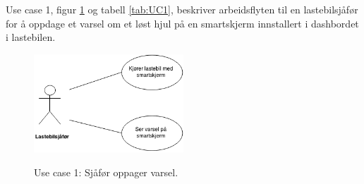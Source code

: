 Use case 1, figur \ref{fig:UC1} og tabell \ref{tab:UC1}, beskriver arbeidsflyten til en 
lastebilsjåfør for å oppdage et varsel om et løst hjul på en 
smartskjerm innstallert i dashbordet i lastebilen.
\newline
\begin{figure}[H]
	\centering
	\includegraphics[width=0.50\textwidth]{images/UC1.png}
	\label{fig:UC1}
	\caption{Use case 1: Sjåfør oppager varsel.}
\end{figure}


